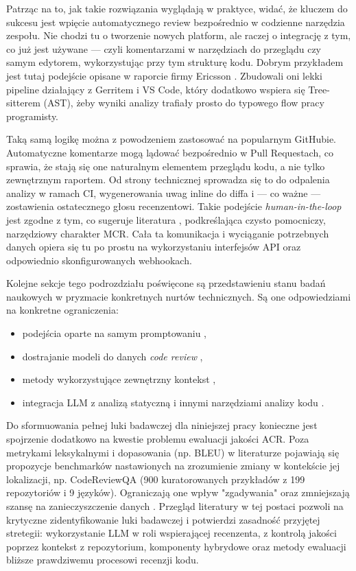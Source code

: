 Patrząc na to, jak takie rozwiązania wyglądają w praktyce, widać, że kluczem do sukcesu 
jest wpięcie automatycznego review bezpośrednio w codzienne narzędzia zespołu. Nie chodzi tu o tworzenie 
nowych platform, ale raczej o integrację z tym, co już jest używane — czyli 
komentarzami w narzędziach do przeglądu czy samym edytorem, wykorzystując przy tym strukturę kodu. Dobrym 
przykładem jest tutaj podejście opisane w raporcie firmy Ericsson \cite{Ramesh2025EricssonExperience}. Zbudowali oni lekki pipeline 
działający z Gerritem i VS Code, który dodatkowo wspiera się Tree-sitterem (AST), żeby wyniki 
analizy trafiały prosto do typowego flow pracy programisty.

Taką samą logikę można z powodzeniem zastosować na popularnym GitHubie. Automatyczne komentarze mogą 
lądować bezpośrednio w Pull Requestach, co sprawia, że stają się one naturalnym elementem 
przeglądu kodu, a nie tylko zewnętrznym raportem. Od strony technicznej sprowadza się to do 
odpalenia analizy w ramach CI, wygenerowania uwag inline do diffa i — co ważne 
— zostawienia ostatecznego głosu recenzentowi. Takie podejście \emph{human-in-the-loop} jest zgodne z tym, co 
sugeruje literatura \cite{bacchelli2013, Ramesh2025EricssonExperience}, podkreślająca czysto pomocniczy, narzędziowy charakter MCR. Cała ta komunikacja i 
wyciąganie potrzebnych danych opiera się tu po prostu na wykorzystaniu interfejsów API oraz odpowiednio 
skonfigurowanych webhookach.

Kolejne sekcje tego podrozdziału poświęcone są przedstawieniu stanu badań naukowych w pryzmacie konkretnych nurtów technicznych.
Są one odpowiedziami na konkretne ograniczenia:
\begin{itemize}
    \item podejścia oparte na samym promptowaniu \cite{Pornprasit2024FineTuningPromptingCR},
    \item dostrajanie modeli do danych \emph{code review} \cite{Pornprasit2024FineTuningPromptingCR},
    \item metody wykorzystujące zewnętrzny kontekst \cite{Ren2025HydraReviewer},
    \item integracja LLM z analizą statyczną i innymi narzędziami analizy kodu \cite{Jaoua2025LLMStaticAnalyzersCR, Ramesh2025EricssonExperience}.
\end{itemize}

Do sformuowania pełnej luki badawczej dla niniejszej pracy konieczne jest spojrzenie dodatkowo na kwestie problemu
ewaluacji jakości ACR. Poza metrykami leksykalnymi i dopasowania (np. BLEU) w literaturze pojawiają się propozycje
benchmarków nastawionych na zrozumienie zmiany w kontekście jej lokalizacji, np. CodeReviewQA (900 kuratorowanych przykładów z 199 repozytoriów 
i 9 języków). Ograniczają one wpływ "zgadywania" oraz zmniejszają szansę na zanieczyszczenie danych \cite{Lin2025CodeReviewQA}. 
Przegląd literatury w tej postaci pozwoli na krytyczne zidentyfikowanie luki badawczej i potwierdzi zasadność przyjętej stretegii:
wykorzystanie LLM w roli wspierającej recenzenta, z kontrolą jakości poprzez kontekst z repozytorium, komponenty hybrydowe oraz metody ewaluacji bliższe
prawdziwemu procesowi recenzji kodu.

